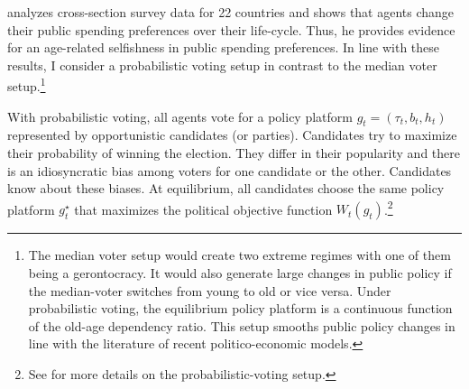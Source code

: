 \cite{Sorensen2013} analyzes cross-section survey data for 22 countries and shows that agents change their public spending preferences over their life-cycle. Thus, he provides evidence for an age-related selfishness in public spending preferences. In line with these results, I consider a probabilistic voting setup in contrast to the median voter setup.\footnote{The median voter setup would create two extreme regimes with one of them being a gerontocracy. It would also generate large changes in public policy if the median-voter switches from young to old or vice versa. Under probabilistic voting, the equilibrium policy platform is a continuous function of the old-age dependency ratio. This setup smooths public policy changes in line with the literature of recent politico-economic models.}

With probabilistic voting, all agents vote for a policy platform $g_t = (\tau_t, b_t, h_t)$ represented by opportunistic candidates (or parties). Candidates try to maximize their probability of winning the election. They differ in their popularity and there is an idiosyncratic bias among voters for one candidate or the other. Candidates know about these biases. At equilibrium, all candidates choose the same policy platform $g_t^\star$ that maximizes the political objective function $W_t(g_t)$.\footnote{See \cite{Lindbeck1987} for more details on the probabilistic-voting setup.}

